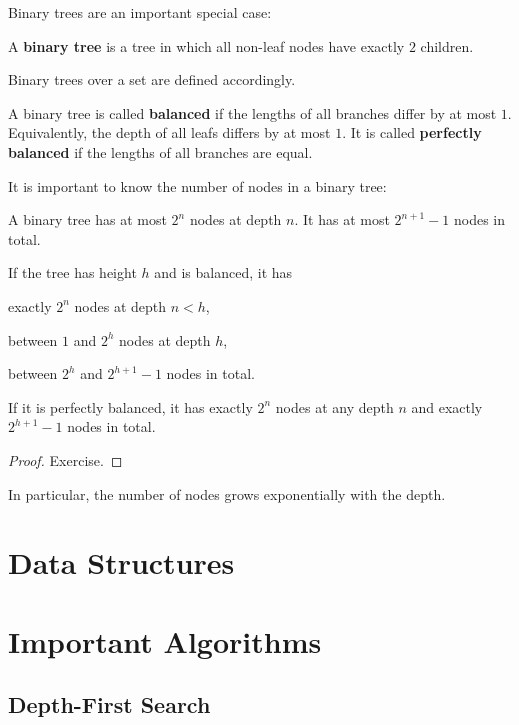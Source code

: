 Binary trees are an important special case:

\begin{definition}\label{def:ad:bintree}
A \textbf{binary tree} is a tree in which all non-leaf nodes have exactly $2$ children.

Binary trees over a set are defined accordingly.

A binary tree is called \textbf{balanced} if the lengths of all branches differ by at most $1$.
Equivalently, the depth of all leafs differs by at most $1$.
It is called \textbf{perfectly balanced} if the lengths of all branches are equal.
\end{definition}

It is important to know the number of nodes in a binary tree:

\begin{theorem}\label{thm:ad:bintree}
A binary tree has at most $2^n$ nodes at depth $n$.
It has at most $2^{n+1}-1$ nodes in total.

If the tree has height $h$ and is balanced, it has
\begin{compactitem}
  \item exactly $2^n$ nodes at depth $n<h$,
  \item between $1$ and $2^h$ nodes at depth $h$,
  \item between $2^h$ and $2^{h+1}-1$ nodes in total. 
\end{compactitem}
If it is perfectly balanced, it has exactly $2^n$ nodes at any depth $n$ and exactly $2^{h+1}-1$ nodes in total.
\end{theorem}
\begin{proof}
Exercise.
\end{proof}

In particular, the number of nodes grows exponentially with the depth.

\section{Data Structures}

\section{Important Algorithms}

\subsection{Depth-First Search}

